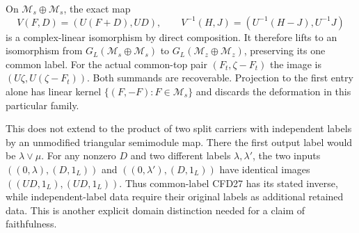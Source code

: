 On $\mathcal M_s\oplus\mathcal M_s$, the exact map
\begin{equation}\tag{CFD27}
 V(F,D)=(U(F+D),UD),\qquad
 V^{-1}(H,J)=(U^{-1}(H-J),U^{-1}J)
\end{equation}
is a complex-linear isomorphism by direct composition. It therefore
lifts to an isomorphism from
$G_L(\mathcal M_s\oplus\mathcal M_s)$ to
$G_L(\mathcal M_z\oplus\mathcal M_z)$, preserving its one common
label. For the actual common-top pair
$(F_t,\zeta-F_t)$ the image is $(U\zeta,U(\zeta-F_t))$.
Both summands are recoverable. Projection to the first entry
alone has linear kernel $\{(F,-F):F\in\mathcal M_s\}$ and
discards the deformation in this particular family.

This does not extend to the product of two split carriers with
independent labels by an unmodified triangular semimodule map.
There the first output label would be $\lambda\vee\mu$. For
any nonzero $D$ and two different labels $\lambda,\lambda'$,
the two inputs $((0,\lambda),(D,1_L))$ and
$((0,\lambda'),(D,1_L))$ have identical images
$((UD,1_L),(UD,1_L))$. Thus common-label CFD27 has its stated
inverse, while independent-label data require their original
labels as additional retained data. This is another explicit
domain distinction needed for a claim of faithfulness.

